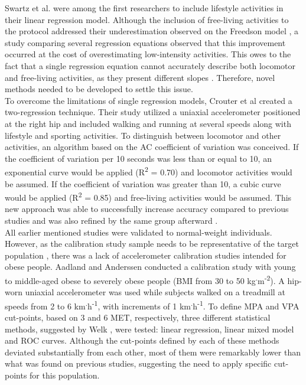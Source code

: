 \documentclass[11pt]{article}
\begin{document}
Swartz et al. \citeyear{Swartz_2000} were among the first researchers to include lifestyle activities in their linear regression model. Although the inclusion of free-living activities to the protocol addressed their underestimation observed on the Freedson model \citeyear{Freedson_1998}, a study comparing several regression equations \cite{Lyden_2012} observed that this improvement occurred at the cost of overestimating low-intensity activities. This owes to the fact that a single regression equation cannot accurately describe both locomotor and free-living activities, as they present different slopes \cite{Crouter_2006}. Therefore, novel methods needed to be developed to settle this issue. \\

To overcome the limitations of single regression models, Crouter et al \citeyear{Crouter_2006} created a two-regression technique. Their study utilized a uniaxial accelerometer positioned at the right hip and included walking and running at several speeds along with lifestyle and sporting activities. To distinguish between locomotor and other activities, an algorithm based on the AC coefficient of variation was conceived. If the coefficient of variation per 10 seconds was less than or equal to 10, an exponential curve would be applied (R\textsuperscript{2} = 0.70) and locomotor activities would be assumed. If the coefficient of variation was greater than 10, a cubic curve would be applied (R\textsuperscript{2} = 0.85) and free-living activities would be assumed. This new approach was able to successfully increase accuracy compared to previous studies and was also refined by the same group afterward \cite{Crouter_2010}. \\

All earlier mentioned studies were validated to normal-weight individuals. However, as the calibration study sample needs to be representative of the target population \cite{Welk_2005, Strath_2012}, there was a lack of accelerometer calibration studies intended for obese people. Aadland and Anderssen \citeyear{Aadland_2012} conducted a calibration study with young to middle-aged obese to severely obese people (BMI from 30 to 50 kg\textsuperscript{.}m\textsuperscript{-2}). A hip-worn uniaxial accelerometer was used while subjects walked on a treadmill at speeds from 2 to 6 km\textsuperscript{.}h\textsuperscript{-1}, with increments of 1 km\textsuperscript{.}h\textsuperscript{-1}.  To define MPA and VPA cut-points, based on 3 and 6 MET, respectively, three different statistical methods, suggested by Welk \citeyear{Welk_2005}, were tested: linear regression, linear mixed model and ROC curves. Although the cut-points defined by each of these methods deviated substantially from each other, most of them were remarkably lower than what was found on previous studies, suggesting the need to apply specific cut-points for this population. \\
\end{document}
